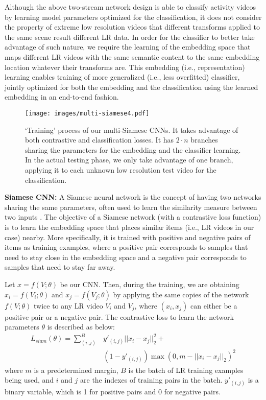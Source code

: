\documentclass[letterpaper]{article} %
\begin{document}
Although the above two-stream network design is able to classify activity videos by learning model parameters optimized for the classification, it does not consider the property of extreme low resolution videos that different transforms applied to the same scene result different LR data. In order for the classifier to better take advantage of such nature, we require the learning of the embedding space that maps different LR videos with the same semantic content to the same embedding location whatever their transforms are. This embedding (i.e., representation) learning enables training of more generalized (i.e., less overfitted) classifier, jointly optimized for both the embedding and the classification using the learned embedding in an end-to-end fashion.


\begin{figure*}
\begin{center}
   \texttt{[image: images/multi-siamese4.pdf]}
\end{center}
   \caption{`Training' process of our multi-Siamese CNNs. It takes advantage of both contrastive and classification losses. It has $2 \cdot n$ branches sharing the parameters for the embedding and the classifier learning. In the actual testing phase, we only take advantage of one branch, applying it to each unknown low resolution test video for the classification.}
\label{fig:multi-siamese}		
\end{figure*}

{\flushleft\textbf{Siamese CNN:} A Siamese neural network is the concept of having two networks sharing the same parameters, often used to learn the similarity measure between two inputs \cite{hadsell2006dimensionality,bell15siggraph}. The objective of a Siamese network (with a contrastive loss function) is to learn the embedding space that places similar items (i.e., LR videos in our case) nearby. More specifically, it is trained with positive and negative pairs of items as training examples, where a positive pair corresponds to samples that need to stay close in the embedding space and a negative pair corresponds to samples that need to stay far away.}

Let $x = f(V ; \theta)$ be our CNN. Then, during the training, we are obtaining $x_i = f(V_i ; \theta)$ and $x_j = f(V_j ; \theta)$ by applying the same copies of the network $f(V ; \theta)$ twice to any LR video $V_i$ and $V_j$, where $(x_i, x_j)$ can either be a positive pair or a negative pair. The contrastive loss to learn the network parameters $\theta$ is described as below:
\begin{equation}
\begin{split}
    L_{siam}(\theta)=\sum_{(i,j)}^B &y'_{(i,j)} ||x_i - x_j||_2^2 + \\
                                &(1-y'_{(i,j)}) \max(0, m-||x_i - x_j||_2)^2
\end{split}
\end{equation}
where $m$ is a predetermined margin, $B$ is the batch of LR training examples being used, and $i$ and $j$ are the indexes of training pairs in the batch. $y'_{(i,j)}$ is a binary variable, which is 1 for positive pairs and 0 for negative pairs.
\end{document}
